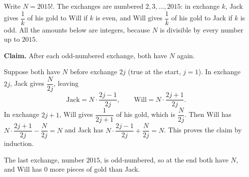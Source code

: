 Write $N=2015!$. The exchanges are numbered $2,3,\dots,2015$: in exchange $k$, Jack gives $\dfrac{1}{k}$ of his gold to Will if $k$ is even, and Will gives $\dfrac{1}{k}$ of his gold to Jack if $k$ is odd. All the amounts below are integers, because $N$ is divisible by every number up to $2015$.

\textbf{Claim.} After each odd-numbered exchange, both have $N$ again.

Suppose both have $N$ before exchange $2j$ (true at the start, $j=1$). In exchange $2j$, Jack gives $\dfrac {N}{2j}$, leaving
\[\text{Jack}=N\cdot\dfrac{2j-1}{2j},\qquad \text{Will}=N\cdot\dfrac{2j+1}{2j}.\]
In exchange $2j+1$, Will gives $\dfrac{1}{2j+1}$ of his gold, which is $\dfrac{N}{2j}$. Then Will has $N\cdot\dfrac{2j+1}{2j}-\dfrac {N}{2j}=N$ and Jack has $N\cdot\dfrac{2j-1}{2j}+\dfrac {N}{2j}=N$. This proves the claim by induction.

The last exchange, number $2015$, is odd-numbered, so at the end both have $N$, and Will has $\boxed{0}$ more pieces of gold than Jack.
